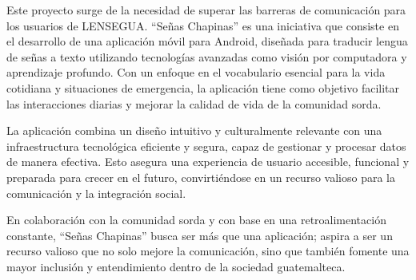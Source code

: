 Este proyecto surge de la necesidad de superar las barreras de comunicación para los usuarios de LENSEGUA. ``Señas Chapinas'' es una iniciativa que consiste en el desarrollo de una aplicación móvil para Android, diseñada para traducir lengua de señas a texto utilizando tecnologías avanzadas como visión por computadora y aprendizaje profundo. Con un enfoque en el vocabulario esencial para la vida cotidiana y situaciones de emergencia, la aplicación tiene como objetivo facilitar las interacciones diarias y mejorar la calidad de vida de la comunidad sorda. 

La aplicación combina un diseño intuitivo y culturalmente relevante con una infraestructura tecnológica eficiente y segura, capaz de gestionar y procesar datos de manera efectiva. Esto asegura una experiencia de usuario accesible, funcional y preparada para crecer en el futuro, convirtiéndose en un recurso valioso para la comunicación y la integración social.

En colaboración con la comunidad sorda y con base en una retroalimentación constante, ``Señas Chapinas'' busca ser más que una aplicación; aspira a ser un recurso valioso que no solo mejore la comunicación, sino que también fomente una mayor inclusión y entendimiento dentro de la sociedad guatemalteca.
